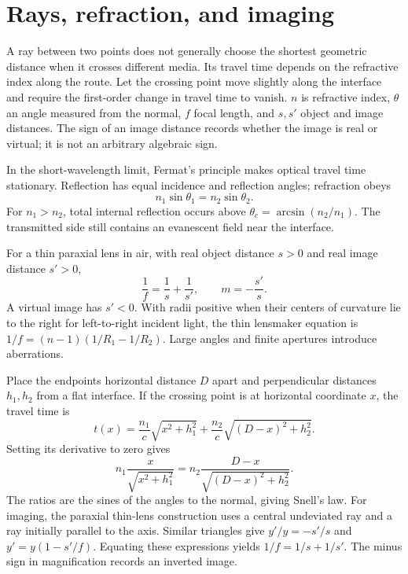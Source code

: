 \documentclass[11pt,oneside]{book}
\theoremstyle{reviewstyle}
\begin{document}
\section{Rays, refraction, and imaging}
A ray between two points does not generally choose the shortest geometric distance when it crosses different media. Its travel time depends on the refractive index along the route. Let the crossing point move slightly along the interface and require the first-order change in travel time to vanish. $n$ is refractive index, $\theta$ an angle measured from the normal, $f$ focal length, and $s,s'$ object and image distances. The sign of an image distance records whether the image is real or virtual; it is not an arbitrary algebraic sign.

In the short-wavelength limit, Fermat's principle makes optical travel time stationary. Reflection has equal incidence and reflection angles; refraction obeys
\begin{equation}n_1\sin\theta_1=n_2\sin\theta_2.\end{equation}
For $n_1>n_2$, total internal reflection occurs above $\theta_c=\arcsin(n_2/n_1)$. The transmitted side still contains an evanescent field near the interface.

For a thin paraxial lens in air, with real object distance $s>0$ and real image distance $s'>0$,
\begin{equation}\frac1f=\frac1s+\frac1{s'},\qquad m=-\frac{s'}s.\end{equation}
A virtual image has $s'<0$. With radii positive when their centers of curvature lie to the right for left-to-right incident light, the thin lensmaker equation is
$1/f=(n-1)(1/R_1-1/R_2)$. Large angles and finite apertures introduce aberrations.

Place the endpoints horizontal distance $D$ apart and perpendicular distances $h_1,h_2$ from a flat interface. If the crossing point is at horizontal coordinate $x$, the travel time is
\begin{equation}
t(x)=\frac{n_1}{c}\sqrt{x^2+h_1^2}
+\frac{n_2}{c}\sqrt{(D-x)^2+h_2^2}.
\end{equation}
Setting its derivative to zero gives
\begin{equation}
n_1\frac{x}{\sqrt{x^2+h_1^2}}
=n_2\frac{D-x}{\sqrt{(D-x)^2+h_2^2}}.
\end{equation}
The ratios are the sines of the angles to the normal, giving Snell's law. For imaging, the paraxial thin-lens construction uses a central undeviated ray and a ray initially parallel to the axis. Similar triangles give $y'/y=-s'/s$ and $y'=y(1-s'/f)$. Equating these expressions yields $1/f=1/s+1/s'$. The minus sign in magnification records an inverted image.
\end{document}

